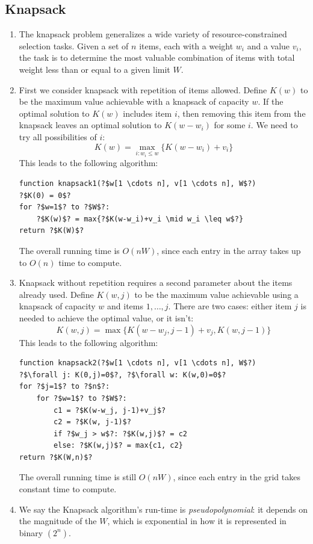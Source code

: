\documentclass[10pt]{article}
\begin{document}
\begin{multicols}{2}
\begin{addmargin}[0.8em]{0.5em}
    \subsection{Knapsack}
    \begin{enumerate}[label=(\alph*)]
        \item The knapsack problem generalizes a wide variety of resource-constrained selection tasks. Given a set of $n$ items, each with a weight $w_i$ and a value $v_i$, the task is to determine the most valuable combination of items with total weight less than or equal to a given limit $W$.
        \item First we consider knapsack with repetition of items allowed. Define $K(w)$ to be the maximum value achievable with a knapsack of capacity $w$. If the optimal solution to $K(w)$ includes item $i$, then removing this item from the knapsack leaves an optimal solution to $K(w - w_i)$ for some $i$. We need to try all possibilities of $i$:
        $$
        K(w) = \max_{i: w_i \leq w} \{ K(w - w_i) + v_i \}
        $$
        This leads to the following algorithm:
        \begin{verbatim}
function knapsack1(?$w[1 \cdots n], v[1 \cdots n], W$?)
?$K(0) = 0$?
for ?$w=1$? to ?$W$?:
    ?$K(w)$? = max{?$K(w-w_i)+v_i \mid w_i \leq w$?}
return ?$K(W)$?
        \end{verbatim}
        The overall running time is $O(nW)$, since each entry in the array takes up to $O(n)$ time to compute.
        
        \item Knapsack without repetition requires a second parameter about the items already used. Define $K(w,j)$ to be the maximum value achievable using a knapsack of capacity $w$ and items $1,\hdots,j$. There are two cases: either item $j$ is needed to achieve the optimal value, or it isn't:
        $$
        K(w,j) = \max\{ K(w-w_j, j-1) + v_j, K(w, j-1) \}
        $$
        This leads to the following algorithm:
        \begin{verbatim}
function knapsack2(?$w[1 \cdots n], v[1 \cdots n], W$?)
?$\forall j: K(0,j)=0$?, ?$\forall w: K(w,0)=0$?
for ?$j=1$? to ?$n$?:
    for ?$w=1$? to ?$W$?:
        c1 = ?$K(w-w_j, j-1)+v_j$?
        c2 = ?$K(w, j-1)$?
        if ?$w_j > w$?: ?$K(w,j)$? = c2
        else: ?$K(w,j)$? = max{c1, c2}
return ?$K(W,n)$?
        \end{verbatim}
        The overall running time is still $O(nW)$, since each entry in the grid takes constant time to compute.
        \item We say the Knapsack algorithm's run-time is \textit{pseudopolynomial}: it depends on the magnitude of the $W$, which is exponential in how it is represented in binary $(2^n)$.
        

\end{enumerate}
\end{addmargin}
\end{multicols}
\end{document}
